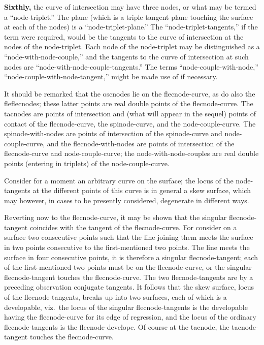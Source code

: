 \documentclass[11pt,a4paper]{article}
\theoremstyle{plain}
\begin{document}
\textbf{Sixthly,} the curve of intersection may have three nodes, or what may be termed a ``node-triplet.'' The plane (which is a triple tangent plane touching the surface at each of the nodes) is a ``node-triplet-plane.'' The ``node-triplet-tangents,'' if the term were required, would be the tangents to the curve of intersection at the nodes of the node-triplet. Each node of the node-triplet may be distinguished as a ``node-with-node-couple,'' and the tangents to the curve of intersection at such nodes are ``node-with-node-couple-tangents.'' The terms ``node-couple-with-node,'' ``node-couple-with-node-tangent,'' might be made use of if necessary.

It should be remarked that the oscnodes lie on the flecnode-curve, as do also the fleflecnodes; these latter points are real double points of the flecnode-curve. The tacnodes are points of intersection and (what will appear in the sequel) points of contact of the flecnode-curve, the spinode-curve, and the node-couple-curve. The spinode-with-nodes are points of intersection of the spinode-curve and node-couple-curve, and the flecnode-with-nodes are points of intersection of the flecnode-curve and node-couple-curve; the node-with-node-couples are real double points (entering in triplets) of the node-couple-curve.

Consider for a moment an arbitrary curve on the surface; the locus of the node-tangents at the different points of this curve is in general a skew surface, which may however, in cases to be presently considered, degenerate in different ways.

Reverting now to the flecnode-curve, it may be shown that the singular flecnode-tangent coincides with the tangent of the flecnode-curve. For consider on a surface two consecutive points such that the line joining them meets the surface in two points consecutive to the first-mentioned two points. The line meets the surface in four consecutive points, it is therefore a singular flecnode-tangent; each of the first-mentioned two points must be on the flecnode-curve, or the singular flecnode-tangent touches the flecnode-curve. The two flecnode-tangents are by a preceding observation conjugate tangents. It follows that the skew surface, locus of the flecnode-tangents, breaks up into two surfaces, each of which is a developable, viz.\ the locus of the singular flecnode-tangents is the developable having the flecnode-curve for its edge of regression, and the locus of the ordinary flecnode-tangents is the flecnode-develope. Of course at the tacnode, the tacnode-tangent touches the flecnode-curve.
\end{document}
